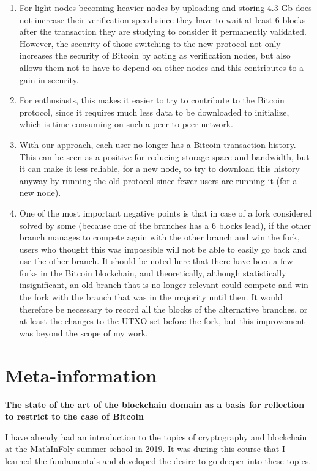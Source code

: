 \documentclass[12pt,a4paper]{article}
\begin{document}
	\begin{enumerate}
		\item For light nodes becoming heavier nodes by uploading and storing 4.3 Gb does not increase their verification speed since they have to wait at least 6 blocks after the transaction they are studying to consider it permanently validated. However, the security of those switching to the new protocol not only increases the security of Bitcoin by acting as verification nodes, but also allows them not to have to depend on other nodes and this contributes to a gain in security.
		\item For enthusiasts, this makes it easier to try to contribute to the Bitcoin protocol, since it requires much less data to be downloaded to initialize, which is time consuming on such a peer-to-peer network.
		\item With our approach, each user no longer has a Bitcoin transaction history. This can be seen as a positive for reducing storage space and bandwidth, but it can make it less reliable, for a new node, to try to download this history anyway by running the old protocol since fewer users are running it (for a new node).
		\item One of the most important negative points is that in case of a fork considered solved by some (because one of the branches has a 6 blocks lead), if the other branch manages to compete again with the other branch and win the fork, users who thought this was impossible will not be able to easily go back and use the other branch. It should be noted here that there have been a few forks in the Bitcoin blockchain, and theoretically, although statistically insignificant, an old branch that is no longer relevant could compete and win the fork with the branch that was in the majority until then. It would therefore be necessary to record all the blocks of the alternative branches, or at least the changes to the UTXO set before the fork, but this improvement was beyond the scope of my work.
	\end{enumerate}
	
	\section{Meta-information}
	
	\textbf{The state of the art of the blockchain domain as a basis for reflection to restrict to the case of Bitcoin\\}
	
	I have already had an introduction to the topics of cryptography and blockchain at the MathInFoly summer school in 2019. It was during this course that I learned the fundamentals and developed the desire to go deeper into these topics.\\
	
\end{document}
